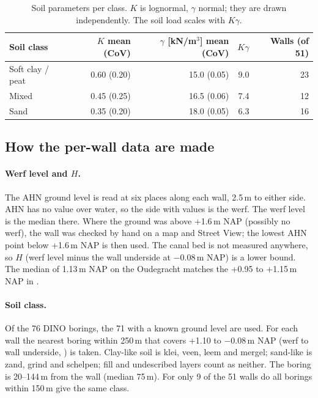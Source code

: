 \begin{table}[htbp]
\centering
\small
\caption{Soil parameters per class. $K$ is lognormal, $\gamma$ normal; they
are drawn independently. The soil load scales with $K\gamma$.}
\label{tab:soil}
\begin{tabular}{@{}l r r r r@{}}
\toprule
Soil class & $K$ mean (CoV) & $\gamma$ [kN/m$^3$] mean (CoV) & $K\gamma$ & Walls (of 51) \\
\midrule
Soft clay / peat & 0.60 (0.20) & 15.0 (0.05) & 9.0 & 23 \\
Mixed            & 0.45 (0.25) & 16.5 (0.06) & 7.4 & 12 \\
Sand             & 0.35 (0.20) & 18.0 (0.05) & 6.3 & 16 \\
\bottomrule
\end{tabular}
\end{table}

\subsection{How the per-wall data are made}\label{app:data-method}

\paragraph{Werf level and $H$.} The AHN ground level is read at six places
along each wall, 2.5\,m to either side. AHN has no value over water, so the
side with values is the werf. The werf level is the median there. Where the
ground was above +1.6\,m NAP (possibly no werf), the wall was checked by hand
on a map and Street View; the lowest AHN point below +1.6\,m NAP is then used.
The canal bed is not measured anywhere, so $H$ (werf level minus the wall
underside at $-0.08$\,m NAP) is a lower bound. The median of 1.13\,m NAP on
the Oudegracht matches the +0.95 to +1.15\,m NAP in
\cite{erfgoed156,erfgoed158}.

\paragraph{Soil class.} Of the 76 DINO borings, the 71 with a known ground
level are used. For each wall the nearest boring within 250\,m that covers
+1.10 to $-0.08$\,m NAP (werf to wall underside, \cite{erfgoed158}) is taken.
Clay-like soil is klei, veen, leem and mergel; sand-like is zand, grind and
schelpen; fill and undescribed layers count as neither. The boring is
20--144\,m from the wall (median 75\,m). For only 9 of the 51 walls do all
borings within 150\,m give the same class.

